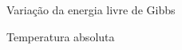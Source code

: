 %

\begin{simbolos}
    \item[$\Delta G$]    Variação da energia livre de Gibbs
    \item[$T$]           Temperatura absoluta
\end{simbolos}
